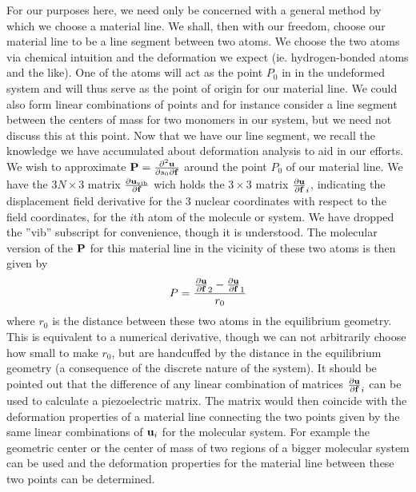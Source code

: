 For our purposes here, we need only be concerned with a general method by which we choose a material line.  We shall, then with our freedom,
choose our material line to be a line segment between two atoms.  
We choose the two atoms via chemical intuition and the deformation we expect
(ie. hydrogen-bonded atoms and the like). 
One of the atoms will act as the point $P_0$ in  in the undeformed system and will thus serve as the point of origin for our
material line.
We could also form linear combinations of points and for instance consider a line segment between the centers of mass for two monomers
in our system, but we need not discuss this at this point.  
Now that we have our line segment, we recall the knowledge we have accumulated about deformation
analysis to aid in our efforts. 
We wish to approximate ${\mathbf P}=\frac{\partial^2{\mathbf u}}{\partial s_0 \partial {\mathbf f}}$ around the point $P_0$ of our material line.
We have the $3N\times 3$ matrix $ {\frac{\partial {\ensuremath{\bf{u}}}_{\mathrm{vib}}}{\partial {\ensuremath{\bf{f}}}}}$ wich holds the $3\times3$ matrix ${\frac{\partial {\ensuremath{\bf{u}}}}{\partial {\ensuremath{\bf{f}}}}}_i$, indicating the 
displacement field derivative for the $3$ nuclear coordinates with respect to the field coordinates, for the $i$th atom of the molecule or system. 
We have dropped the ''vib'' subscript for convenience, though it is understood.
The molecular version of the ${\bf{P}}$ for this material line in the vicinity of these two atoms is then given by
\begin{equation}
\label{eq:INeedIt2}
 P = \frac{{\frac{\partial {\ensuremath{\bf{u}}}}{\partial {\ensuremath{\bf{f}}}}}_2 - {\frac{\partial {\ensuremath{\bf{u}}}}{\partial {\ensuremath{\bf{f}}}}}_1}{r_0}  
\end{equation}
where $r_0$ is the distance between these two atoms in the equilibrium geometry. 
This is equivalent to a numerical derivative, though we can not arbitrarily choose how small to make $r_0$, but are handcuffed by the distance in the 
equilibrium geometry (a consequence of the discrete nature of the system).  It should be pointed out that the difference of any linear combination
of matrices ${\frac{\partial {\ensuremath{\bf{u}}}}{\partial {\ensuremath{\bf{f}}}}}_i$ can be used to calculate a piezoelectric matrix.  
The matrix would then coincide with the deformation properties of a material line connecting the two points given by the same linear combinations of ${\bf{u}}_i$
for the molecular system.  
For example the geometric center or the center of mass of two regions of a bigger molecular system can be used and the deformation properties 
for the material line between these two points can be determined.

